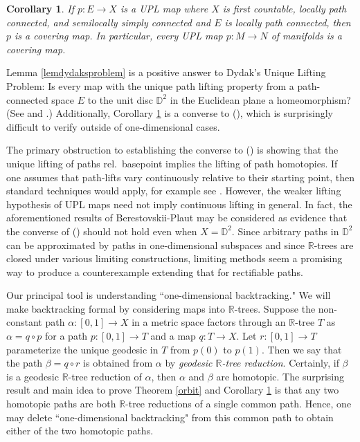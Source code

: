 \documentclass[12pt, leqno]{amsart}
\newcommand{\ui}{[0,1]}
\newcommand{\bbd}{\mathbb{D}}
\newcommand{\bbr}{\mathbb{R}}
\newtheorem{corollary}[theorem]{Corollary}
\theoremstyle{definition}\newtheorem{definition}[theorem]{Definition}
\begin{document}
\begin{corollary}\label{corcoveringmap}
If $p:E\to X$ is a UPL map where $X$ is first countable, locally path connected, and semilocally simply connected and $E$ is locally path connected, then $p$ is a covering map. In particular, every UPL map $p:M\to N$ of manifolds is a covering map.
\end{corollary}

\noindent  Lemma \ref{lemdydaksproblem} is a positive answer to Dydak's Unique Lifting Problem: Is every map with the unique path lifting  property from a path-connected space $E$ to the unit disc $\mathbb D^2$ in the Euclidean plane  a homeomorphism?  (See \cite[Problem 2.3]{Dydak} and \cite[ Problem 4.6]{BM}.) Additionally, Corollary \ref{corcoveringmap} is a converse to (\textasteriskcentered), which is surprisingly difficult to verify outside of one-dimensional cases.

The primary obstruction to establishing the converse to (\textasteriskcentered) is showing that the unique lifting of paths rel.\ basepoint implies the lifting of path homotopies. If one assumes that path-lifts vary continuously relative to their starting point, then standard techniques would apply, for example see  \cite[Section 12 of Chapter III]{Hu}. However, the weaker lifting hypothesis of UPL maps need not imply continuous lifting in general. In fact, the aforementioned results of Berestovskii-Plaut may be considered as evidence that the converse of (\textasteriskcentered) should not hold even when $X=\bbd^2$.  Since arbitrary paths in $\bbd^2$ can be approximated by paths in one-dimensional subspaces and since $\bbr$-trees are closed under various limiting constructions, limiting methods seem a promising way to produce a counterexample extending that for rectifiable paths. %


Our principal tool is understanding ``one-dimensional backtracking." We will make backtracking formal by considering maps into $\mathbb R$-trees.  Suppose the non-constant path $\alpha:\ui\to X$ in a metric space factors through an $\bbr$-tree $T$ as $\alpha=q \circ p $ for a path $p:\ui\to T$ and a map $q:T\to X$. Let $r:\ui\to T$ parameterize the unique geodesic in $T$ from $p(0)$ to $p(1)$. Then we say that the path $\beta=q \circ r$ is obtained from $\alpha$ by \emph{geodesic $\bbr$-tree reduction}. Certainly, if $\beta$ is a geodesic $\bbr$-tree reduction of $\alpha$, then $\alpha$ and $\beta$ are homotopic. The surprising result and main idea to prove Theorem \ref{orbit} and Corollary \ref{corcoveringmap} is that any two homotopic paths are both $\bbr$-tree reductions of a single common path. Hence, one may delete ``one-dimensional backtracking" from this common path to obtain either of the two homotopic paths.
\end{document}
